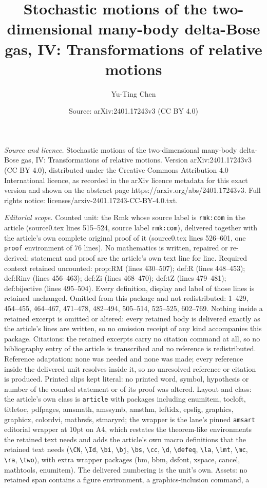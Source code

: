 \documentclass[10pt,a4paper]{amsart}
\title[Stochastic motions of the two-dimensional many-body delta-Bo]{Stochastic motions of the two-dimensional many-body delta-Bose gas, IV: Transformations of relative motions}
\author{Yu-Ting Chen}
\date{Source: arXiv:2401.17243v3 (CC BY 4.0)}
\begin{document}
\maketitle

\noindent\emph{Source and licence.} Stochastic motions of the two-dimensional many-body delta-Bose gas, IV: Transformations of relative motions. Version arXiv:2401.17243v3 (CC BY 4.0), distributed under the Creative Commons Attribution 4.0 International licence, as recorded in the arXiv licence metadata for this exact version and shown on the abstract page https://arxiv.org/abs/2401.17243v3. Full rights notice: licenses/arxiv-2401.17243-CC-BY-4.0.txt.\par\smallskip

\noindent\textit{Editorial scope.} Counted unit: the Rmk whose source label is \texttt{rmk:com} in the article (source0.tex lines 515--524, source label \texttt{rmk:com}), delivered together with the article's own complete original proof of it (source0.tex lines 526--601, one \texttt{proof} environment of 76 lines). No mathematics is written, repaired or re-derived: statement and proof are the article's own text line for line. Required context retained uncounted: prop:RM (lines 430--507); def:R (lines 448--453); def:Rinv (lines 456--463); def:Zi (lines 468--470); def:tZ (lines 479--481); def:bijective (lines 495--504). Every definition, display and label of those lines is retained unchanged. Omitted from this package and not redistributed: 1--429, 454--455, 464--467, 471--478, 482--494, 505--514, 525--525, 602--769. Nothing inside a retained excerpt is omitted or altered: every retained body is delivered exactly as the article's lines are written, so no omission receipt of any kind accompanies this package. Citations: the retained excerpts carry no citation command at all, so no bibliography entry of the article is transcribed and no reference is redistributed. Reference adaptation: none was needed and none was made; every reference inside the delivered unit resolves inside it, so no unresolved reference or citation is produced. Printed slips kept literal: no printed word, symbol, hypothesis or number of the counted statement or of its proof was altered. Layout and class: the article's own class is \texttt{article} with packages including enumitem, tocloft, titletoc, pdfpages, amsmath, amssymb, amsthm, leftidx, epsfig, graphics, graphicx, colordvi, mathrsfs, stmaryrd; the wrapper is the lane's pinned \texttt{amsart} editorial wrapper at 10pt on A4, which restates the theorem-like environments the retained text needs and adds the article's own macro definitions that the retained text needs (\texttt{\textbackslash CN}, \texttt{\textbackslash Id}, \texttt{\textbackslash bi}, \texttt{\textbackslash bj}, \texttt{\textbackslash bs}, \texttt{\textbackslash cc}, \texttt{\textbackslash d}, \texttt{\textbackslash defeq}, \texttt{\textbackslash la}, \texttt{\textbackslash lmt}, \texttt{\textbackslash mc}, \texttt{\textbackslash ra}, \texttt{\textbackslash two}), with extra wrapper packages (bm, bbm, dsfont, xspace, cancel, mathtools, enumitem). The delivered numbering is the unit's own. Assets: no retained span contains a figure environment, a graphics-inclusion command, a 
\end{document}

